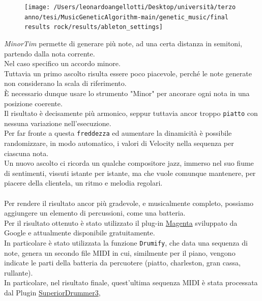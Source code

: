 \documentclass[a4paper,12pt]{report}
\begin{document}
\begin{figure}[H]
    \centering
    \texttt{[image: /Users/leonardoangellotti/Desktop/università/terzo anno/tesi/MusicGeneticAlgorithm-main/genetic\_music/final results rock/results/ableton\_settings]} 
    \label{fig:immagine}
\end{figure}

\textit{MinorTim} permette di generare più note, ad una certa distanza in semitoni, partendo dalla nota corrente. \\
Nel caso specifico un accordo minore. \\
Tuttavia un primo ascolto risulta essere poco piacevole, perché le note generate non considerano la scala di riferimento. \\
È necessario dunque usare lo strumento "Minor" per ancorare ogni nota in una posizione coerente. \\
Il risultato è decisamente più armonico, seppur tuttavia ancor troppo \texttt{piatto} con nessuna variazione nell'esecuzione. \\
Per far fronte a questa \texttt{freddezza} ed aumentare la dinamicità è possibile randomizzare, in modo automatico, i valori di Velocity nella sequenza per ciascuna nota. \\
Un nuovo ascolto ci ricorda un qualche compositore jazz, immerso nel suo fiume di sentimenti, vissuti istante per istante, 
ma che vuole comunque mantenere, per piacere della clientela, un ritmo e melodia regolari. \\
\\
Per rendere il risultato ancor più gradevole, e musicalmente completo, possiamo aggiungere un elemento di percussioni, come una batteria. \\
Per il risultato ottenuto è stato utilizzato il plug-in \href{https://magenta.tensorflow.org/studio}{Magenta}  sviluppato da Google e attualmente disponibile gratuitamente. \\
In particolare è stato utilizzata la funzione \texttt{Drumify}, che data una sequenza di note, genera un secondo file MIDI in cui, similmente per il piano, vengono indicate le parti della batteria da percuotere (piatto, charleston, gran cassa, rullante). \\
In particolare, nel risultato finale, quest'ultima sequenza MIDI è stata processata dal Plugin \href{https://www.toontrack.com/product/superior-drummer-3/?gad_source=1&gclid=Cj0KCQjws560BhCuARIsAHMqE0H2FsGI5sBj5JLtPNhhiKiLf9qMEccOntk8F9uc4_ZvSDPK5TCZZKUaAg1LEALw_wcB}{SuperiorDrummer3},
\end{document}
